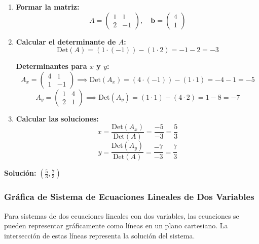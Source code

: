     \begin{enumerate}
        \item \textbf{Formar la matriz:}
            \[
            A = \begin{pmatrix}
            1 & 1 \\
            2 & -1
            \end{pmatrix}, \quad \textbf{b} = \begin{pmatrix}
            4 \\
            1
            \end{pmatrix}
            \]
        \item \textbf{Calcular el determinante de \(A\):}
            \[
            \text{Det}(A) = (1 \cdot (-1)) - (1 \cdot 2) = -1 - 2 = -3
            \]
    
            \textbf{Determinantes para \(x\) y \(y\):}
            \[
            A_x = \begin{pmatrix}
            4 & 1 \\
            1 & -1
            \end{pmatrix} \implies \text{Det}(A_x) = (4 \cdot (-1)) - (1 \cdot 1) = -4 - 1 = -5
            \]
            \[
            A_y = \begin{pmatrix}
            1 & 4 \\
            2 & 1
            \end{pmatrix} \implies \text{Det}(A_y) = (1 \cdot 1) - (4 \cdot 2) = 1 - 8 = -7
            \]
    
        \item \textbf{Calcular las soluciones:}
            \[
            x = \frac{\text{Det}(A_x)}{\text{Det}(A)} = \frac{-5}{-3} = \frac{5}{3}
            \]
            \[
            y = \frac{\text{Det}(A_y)}{\text{Det}(A)} = \frac{-7}{-3} = \frac{7}{3}
            \]
    \end{enumerate}
    
    \textbf{Solución:} \( \left( \frac{5}{3}, \frac{7}{3} \right) \)
    
     
    
    \subsubsection{Gráfica de Sistema de Ecuaciones Lineales de Dos Variables}
    
    Para sistemas de dos ecuaciones lineales con dos variables, las ecuaciones se pueden representar gráficamente como líneas en un plano cartesiano. La intersección de estas líneas representa la solución del sistema.
    
